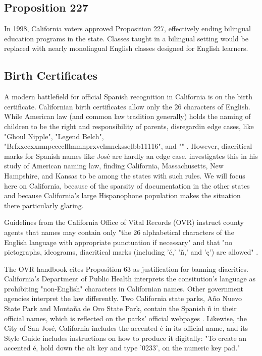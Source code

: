\subsection{Proposition 227}

In 1998, California voters approved Proposition 227, effectively ending bilingual education programs in the state. Classes taught in a bilingual setting would be replaced with nearly monolingual English classes designed for English learners.

\subsection{Birth Certificates}

A modern battlefield for official Spanish recognition in California is on the
birth certificate. Californian birth certificates allow only the 26 characters
of English. While American law (and common law tradition generally) holds the
naming of children to be the right and responsibility of parents, disregardin
edge cases, like "Ghoul Nipple", "Legend Belch",
"Brfxxccxxmnpcccclllmmnprxvclmnckssqlbb11116", and "" \parencite{larson11}.
However, diacritical marks for Spanish names like José are hardly an edge case.
\textcite[5]{larson11} investigates this in his study of American naming law,
finding California, Massachusetts, New Hampshire, and Kansas to be among the
states with such rules. We will focus here on California, because of the
sparsity of documentation in the other states and because California's large
Hispanophone population makes the situation there particularly glaring.

Guidelines from the California Office of Vital Records (OVR) instruct county
agents that names may contain only "the 26 alphabetical characters of the
English language with appropriate punctuation if necessary" and that "no
pictographs, ideograms, diacritical marks (including 'é,' 'ñ,' and 'ç') are
allowed" \parencite{larson11}.

The OVR handbook cites Proposition 63 as justification for banning diacritics.
California's Department of Public Health interprets the consitution's language
as prohibiting "non-English" characters in Californian names. Other government
agencies interpret the law differently. Two California state parks, Año Nuevo
State Park and Montaña de Oro State Park, contain the Spanish ñ in their
official names, which is reflected on the parks' official webpages
\parencite{año-nuevo} \parencite{montaña-de-oro}. Likewise, the City of San
José, California includes the accented é in its official name, and its Style
Guide includes instructions on how to produce it digitally: "To create an
accented é, hold down the alt key and type '0233'‚ on the numeric key pad."
\textcite{san-josé}

